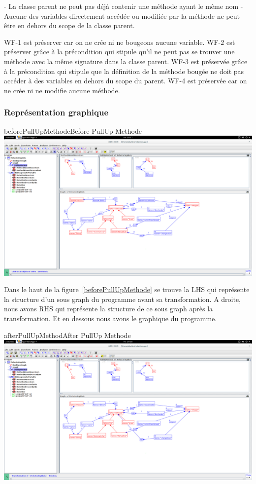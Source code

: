 \documentclass[a4paper, 10pt]{article}
\begin{document}
- La classe parent ne peut pas déjà contenir une méthode ayant le même nom
- Aucune des variables directement accédée ou modifiée par la méthode ne peut être en dehors du scope de la classe parent.

WF-1 est préserver car on ne crée ni ne bougeons aucune variable.
WF-2 est préserver grâce à la précondition qui stipule qu'il ne peut pas se trouver une méthode avec la même signature dans la classe parent.
WF-3 est préservée grâce à la précondition qui stipule que la définition de la méthode bougée ne doit pas accéder à des variables en dehors du scope du parent.
WF-4 est préservée car on ne crée ni ne modifie aucune méthode.

\subsubsection{Représentation graphique}

\begin{myfig}{beforePullUpMethode}{Before PullUp Methode}
\includegraphics[width=\textwidth]{beforePullUpMethode.png}
\end{myfig}

Dans le haut de la figure~\ref{beforePullUpMethode} se trouve la LHS qui représente la structure d'un sous graph du programme avant sa transformation. A droite, nous avons RHS qui représente la structure de ce sous graph après la transformation. Et en dessous nous avons le graphique du programme.

\begin{myfig}{afterPullUpMethod}{After PullUp Methode}
\includegraphics[width=\textwidth]{afterPullUpMethod.png}
\end{myfig}
\end{document}
